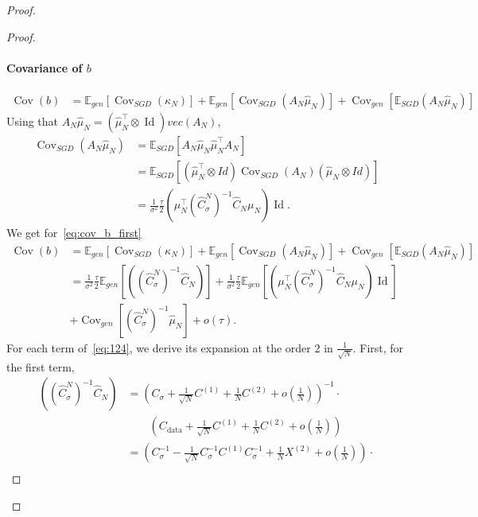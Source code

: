 \documentclass[11pt]{article}
\newcommand{\id}{\operatorname{Id}}
\newcommand{\EE}{\mathbb{E}}
\newcommand{\cov}{\operatorname{Cov}}
\begin{document}
\begin{proof}
\begin{proof}
\paragraph{Covariance of $b$}
\begin{align} \label{eq:cov_b_first}
    \cov(b) &= \mathbb{E}_{gen} [\operatorname{Cov}_{SGD} (\kappa_N)] + \mathbb{E}_{gen} [\operatorname{Cov}_{SGD} (A_N \hat \mu_N)] + \operatorname{Cov}_{gen} [\mathbb{E}_{SGD} (A_N \hat \mu_N)] 
\end{align}
Using that $A_N \hat \mu_N = (\hat \mu_N^\top \otimes \id) vec(A_N)$, 
\begin{align*}
\operatorname{Cov}_{SGD} (A_N \hat \mu_N) &= \EE_{SGD}\left[ A_N \hat \mu_N \hat \mu_N^\top A_N \right] \\
&= \EE_{SGD}\left[ (\hat \mu_N^\top \otimes Id) \cov_{SGD}(A_N)   (\hat \mu_N \otimes Id) \right] \\
&= \frac{1}{\sigma^2} \frac{\tau}{2} \left(\mu_N^\top  (\hat C^N_\sigma)^{-1} \hat C_N  \mu_N \right)  \id .
\end{align*}
We get for~\eqref{eq:cov_b_first}
\begin{align}
    \cov(b) &= \mathbb{E}_{gen} [\operatorname{Cov}_{SGD} (\kappa_N)] + \mathbb{E}_{gen} [\operatorname{Cov}_{SGD} (A_N \hat \mu_N)] + \operatorname{Cov}_{gen} [\mathbb{E}_{SGD} (A_N \hat \mu_N)] \\
    &= \label{eq:124}  \frac{1}{\sigma^2} \frac{\tau}{2}\EE_{gen} \left[\left( (\hat C^N_\sigma)^{-1} \hat C_N \right) \right] + \frac{1}{\sigma^2} \frac{\tau}{2}\mathbb{E}_{gen} \left[ \left(\mu_N^\top  (\hat C^N_\sigma)^{-1} \hat C_N  \mu_N \right) \id\right]  \\&+ \cov_{gen}[(\hat C_\sigma^N)^{-1} \hat \mu_N] + o(\tau) \nonumber .
\end{align}
For each term of~\eqref{eq:124}, we derive its expansion at the order $2$ in $\frac{1}{\sqrt{N}}$. First, for the first term,
\begin{align*}
\left( (\hat C^N_\sigma)^{-1} \hat C_N \right) &=  \left(C_\sigma + \frac{1}{\sqrt{N}}   C^{(1)} + \frac{1}{N}  C^{(2)} + o\left( \frac{1}{N}\right) \right)^{-1} \cdot  \\
&\qquad \nonumber \left(C_\mathrm{data} + \frac{1}{\sqrt{N}}   C^{(1)} + \frac{1}{N}  C^{(2)} + o\left( \frac{1}{N}\right)  \right) \\
&= \left(C_\sigma^{-1} - \frac{1}{\sqrt{N}} C_\sigma^{-1}   C^{(1)} C_\sigma^{-1} +  \frac1N X^{(2)} + o\left( \frac{1}{{N}}\right) \right) \cdot  \\

\end{align*}
\end{proof}
\end{proof}
\end{document}
